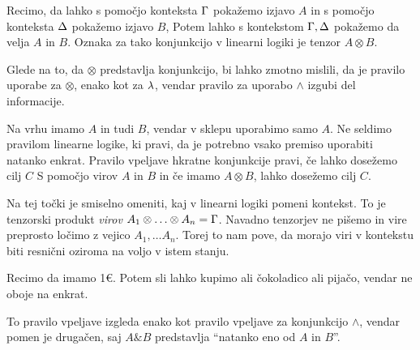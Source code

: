 Recimo, da lahko s pomočjo konteksta \(\Gamma\) pokažemo izjavo \(A\) in s pomočjo konteksta \(\Delta\) pokažemo izjavo \(B\), Potem lahko s kontekstom \(\Gamma, \Delta\) pokažemo da velja \(A\) in \(B\). Oznaka za tako konjunkcijo v linearni logiki je tenzor \(A \otimes B\). 
%
\begin{prooftree}
\end{prooftree}
%

Glede na to, da \(\otimes\) predstavlja konjunkcijo, bi lahko zmotno mislili, da je pravilo uporabe za \(\otimes\), enako kot za \(\lambda\), vendar pravilo za uporabo \(\land\) izgubi del informacije.
%
\begin{prooftree}
\end{prooftree}
%
Na vrhu imamo \(A\) in tudi \(B\), vendar v sklepu uporabimo samo \(A\). Ne seldimo pravilom linearne logike, ki pravi, da je potrebno vsako premiso uporabiti natanko enkrat. %
Pravilo vpeljave hkratne konjunkcije pravi, če lahko dosežemo cilj \(C\) S pomočjo virov \(A\) in \(B\) in če imamo \(A \otimes B\), lahko dosežemo cilj \(C\).
%
\begin{prooftree}
\end{prooftree}
%
Na tej točki je smiselno omeniti, kaj v linearni logiki pomeni kontekst. To je tenzorski produkt \emph{virov} \(A_1 \otimes \ldots \otimes A_n = \Gamma\). Navadno tenzorjev ne pišemo in vire preprosto ločimo z vejico \(A_1, \ldots A_n\). %
Torej to nam pove, da morajo viri v kontekstu biti resnični oziroma na voljo v istem stanju.


Recimo da imamo 1€. Potem sli lahko kupimo ali čokoladico ali pijačo, vendar ne oboje na enkrat. 
%
\begin{prooftree}
\end{prooftree}
%
To pravilo vpeljave izgleda enako kot pravilo vpeljave za konjunkcijo \(\land\), vendar pomen je drugačen, saj \(A \& B\) predstavlja ``natanko eno od \(A\) in \(B\)''.

